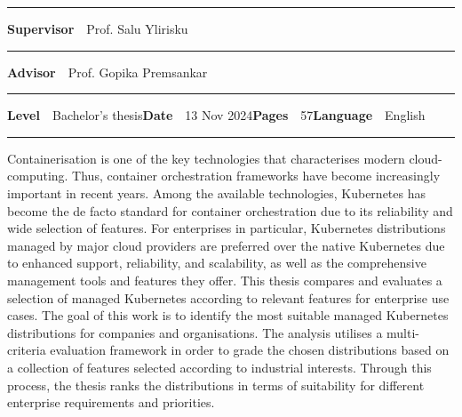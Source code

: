 \begin{spacing}{.88}
{\vspace{-2.4mm}\rule{\textwidth}{.75pt}

{\fontsize{10.5pt}{10.5pt}\bfseries\sffamily\lsstyle Supervisor}~~{\small Prof. Salu Ylirisku}

\vspace{-2.4mm}\rule{\textwidth}{.75pt}

{\fontsize{10.5pt}{10.5pt}\bfseries\sffamily\lsstyle Advisor}~~{\small Prof. Gopika Premsankar}

\vspace{-2.4mm}\rule{\textwidth}{.75pt}

{\fontsize{10.5pt}{10.5pt}\bfseries\sffamily\lsstyle Level}~~{\small Bachelor's thesis}\hfill{\fontsize{10.5pt}{10.5pt}\bfseries\sffamily\lsstyle Date}~~{\small 13 Nov 2024}\hfill{\fontsize{10.5pt}{10.5pt}\bfseries\sffamily\lsstyle Pages}~~{\small 57}\hfill{\fontsize{10.5pt}{10.5pt}\bfseries\sffamily\lsstyle Language}~~{\small English}

\vspace{-2.4mm}\rule{\textwidth}{.75pt}

\vspace{6mm}

} %
\end{spacing}
\begin{spacing}{1.05}

\vspace{.8mm}

{\small
  Containerisation is one of the key technologies that characterises modern cloud-computing. Thus, container orchestration frameworks have become increasingly important in recent years. Among the available technologies, Kubernetes has become the de facto standard for container orchestration due to its reliability and wide selection of features. For enterprises in particular, Kubernetes distributions managed by major cloud providers are preferred over the native Kubernetes due to enhanced support, reliability, and scalability, as well as the comprehensive management tools and features they offer. This thesis compares and evaluates a selection of managed Kubernetes according to relevant features for enterprise use cases. The goal of this work is to identify the most suitable managed Kubernetes distributions for companies and organisations. The analysis utilises a multi-criteria evaluation framework in order to grade the chosen distributions based on a collection of features selected according to industrial interests. Through this process, the thesis ranks the distributions in terms of suitability for different enterprise requirements and priorities.
}

\vfill

\end{spacing}
